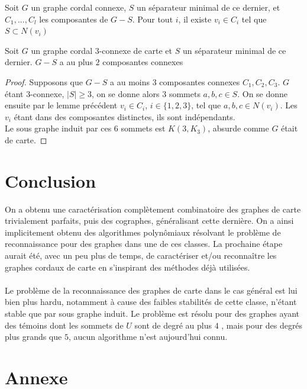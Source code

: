 \documentclass{scrartcl}
\begin{document}
\begin{flushleft}
\begin{lem}\label{cordsepintercliquemax}
    Soit $G$ un graphe cordal connexe, $S$ un séparateur minimal de ce dernier, et $C_1, ..., C_l$ les composantes de $G - S$. Pour tout
    $i$, il existe $v_i \in C_i$ tel que $S \subset N(v_i)$
\end{lem}

\begin{cor}
    Soit $G$ un graphe cordal $3$-connexe de carte et $S$ un séparateur minimal de ce dernier. $G - S$ a au plus $2$ composantes
    connexes
\end{cor}

\begin{proof}
    Supposons que $G - S$ a au moins $3$ composantes connexes $C_1, C_2, C_3$. $G$ étant $3$-connexe, $|S| \geq 3$, on se donne
    alors $3$ sommets $a,b,c \in S$. On se donne ensuite par le lemme précédent $v_i \in C_i$, $i \in \{1,2,3\}$, tel que
    $a,b,c \in N(v_i)$. Les $v_i$ étant dans des composantes distinctes, ils sont indépendants.\\
    Le sous graphe induit par ces $6$ sommets est $K(3, K_3)$, absurde comme $G$ était de carte.
\end{proof}

\section*{Conclusion}

On a obtenu une caractérisation complètement combinatoire des graphes de carte trivialement parfaits, puis des cographes,
généralisant cette dernière. On a ainsi implicitement obtenu des algorithmes polynômiaux résolvant le problème de reconnaissance
pour des graphes dans une de ces classes. La prochaine étape aurait été, avec un peu plus de temps, de caractériser et/ou
reconnaître les graphes cordaux de carte en s'inspirant des méthodes déjà utilisées.
\\~\\
Le problème de la reconnaissance des graphes de carte dans le cas général est lui bien plus hardu, notamment à cause des faibles
stabilités de cette classe, n'étant stable que par sous graphe induit. Le problème est résolu pour des graphes ayant des témoins dont
les sommets de $U$ sont de degré au plus $4$ \cite{IntroMap},
mais pour des degrés plus grands que $5$, aucun algorithme n'est aujourd'hui connu.





\section*{Annexe}


\end{flushleft}
\end{document}
